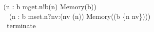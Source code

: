 \documentclass{llncs}
\begin{document}
\begin{argue}
\begin{block}
(\Extchoice n : \dom b \circspot mget.n!b(n) \then Memory(b))\\
\extchoice~
(\Extchoice n : \dom b \circspot mset.n?nv:(nv \in \delta(n)) \then
Memory((b \oplus \{n \mapsto nv\})))\\
\extchoice~terminate \then \Skip
\end{block}\\
\end{argue}
\end{document}
